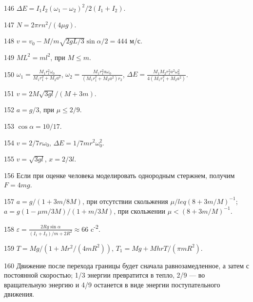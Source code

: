 \begin{Answer}{146}
$\Delta E = I_1 I_2 (\omega_1 - \omega_2)^2/ 2(I_1 + I_2)$.
\end{Answer}
\begin{Answer}{147}
$N = 2\pi r n^2/(4 \mu g)$.
\end{Answer}
\begin{Answer}{148}
$v = v_0 -M/m \sqrt{2gL/3} \sin \alpha /2 = 444$ м/с.
\end{Answer}
\begin{Answer}{149}
$ML^2 = ml^2$, при $M \leq m$.
\end{Answer}
\begin{Answer}{150}
$\omega_1 = \frac{M_1r_1^2\omega_0}{M_1r_1^2 + M_2a^2}$, $\omega_2 = \frac{M_1r_1^2 a \omega_0}{(M_1r_1^2 + M_2a^2)r_2}$, $\Delta E = \frac{M_1 M_2r_1^2a^2\omega_0^2}{4(M_1r_1^2 + M_2a^2)}$.
\end{Answer}
\begin{Answer}{151}
$v = 2M\sqrt{3gl}/(M+3m)$.
\end{Answer}
\begin{Answer}{152}
$a = g/3$, при $\mu \leq 2/9$.
\end{Answer}
\begin{Answer}{153}
$\cos \alpha = 10/17$.
\end{Answer}
\begin{Answer}{154}
$v = 2/7r \omega_0$, $\Delta E = 1/7 mr^2 \omega_0^2$.
\end{Answer}
\begin{Answer}{155}
$v = \sqrt{3gl}$, $x = 2/3l$.
\end{Answer}
\begin{Answer}{156}
Если при оценке человека моделировать однородным стержнем, получим $F = 4mg$.
\end{Answer}
\begin{Answer}{157}
$a = g/(1+3m/8M)$, при отсутствии скольжения $\mu /leq (8+3m/M)^{-1}$; $a = g(1 - \mu m/3M)/(1+m/3M)$, при скольжении $\mu < (8+3m/M)^{-1}$.
\end{Answer}
\begin{Answer}{158}
$\varepsilon = \frac{2Rg \sin \alpha}{(I_1 + I_2)/m + 2R^2} \approx 66$ c\textsuperscript{-2}.
\end{Answer}
\begin{Answer}{159}
$T = Mg/(1 + Mr^2/(4mR^2))$, $T_1 = Mg + MhrT/(\pi m R^2)$.
\end{Answer}
\begin{Answer}{160}
Движение после перехода границы будет сначала равнозамедленное, а затем с постоянной скоростью; 1/3 энергии превратится в тепло, 2/9 — во вращательную энергию и 4/9 останется в виде энергии поступательного движения.
\end{Answer}
